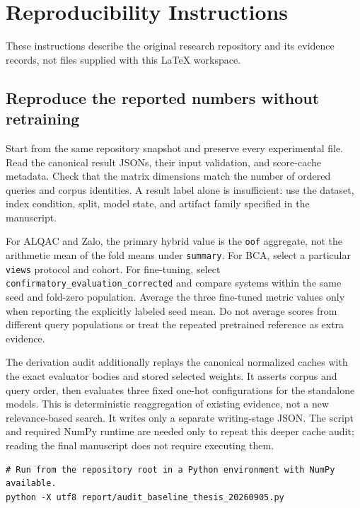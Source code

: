 \chapter{Reproducibility Instructions}

These instructions describe the original research repository and its evidence records, not files supplied with this LaTeX workspace.
\section{Reproduce the reported numbers without retraining}

Start from the same repository snapshot and preserve every experimental file. Read the canonical result JSONs, their input validation, and score-cache metadata. Check that the matrix dimensions match the number of ordered queries and corpus identities. A result label alone is insufficient: use the dataset, index condition, split, model state, and artifact family specified in the manuscript.

For ALQAC and Zalo, the primary hybrid value is the \texttt{oof} aggregate, not the arithmetic mean of the fold means under \texttt{summary}. For BCA, select a particular \texttt{views} protocol and cohort. For fine-tuning, select \texttt{confirma\allowbreak{}tory\_eva\allowbreak{}luation\_\allowbreak{}correcte\allowbreak{}d} and compare systems within the same seed and fold-zero population. Average the three fine-tuned metric values only when reporting the explicitly labeled seed mean. Do not average scores from different query populations or treat the repeated pretrained reference as extra evidence.

The derivation audit additionally replays the canonical normalized caches with the exact evaluator bodies and stored selected weights. It asserts corpus and query order, then evaluates three fixed one-hot configurations for the standalone models. This is deterministic reaggregation of existing evidence, not a new relevance-based search. It writes only a separate writing-stage JSON. The script and required NumPy runtime are needed only to repeat this deeper cache audit; reading the final manuscript does not require executing them.

\begin{Verbatim}[fontsize=\footnotesize,breaklines=true,breakanywhere=true]
# Run from the repository root in a Python environment with NumPy available.
python -X utf8 report/audit_baseline_thesis_20260905.py
\end{Verbatim}

